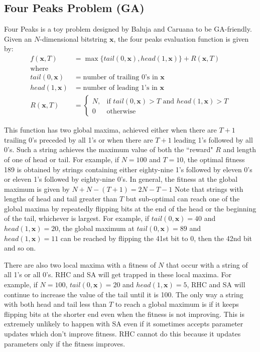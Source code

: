 \documentclass[letterpaper]{article}
\begin{document}
	\subsection{Four Peaks Problem (GA)}
	\label{sec:4peaks}
	Four Peaks is a toy problem designed by Baluja and Caruana\cite{balujaRemovingGeneticsStandard1995} to be GA-friendly. Given an $N$-dimensional bitstring $\mathbf{x}$, the four peaks evaluation function is given by:
	\begin{align*}
		f(\mathbf{x}, T) &= \max\{tail(0, \mathbf{x}), head(1, \mathbf{x})\} + R(\mathbf{x}, T) \\
		\text{where} \\
		tail(0, \mathbf{x}) &= \text{number of trailing 0's in } \mathbf{x} \\
		head(1, \mathbf{x}) &= \text{number of leading 1's in } \mathbf{x} \\
		R(\mathbf{x}, T) &= 
		\begin{cases}
		N, & \text{if } tail(0, \mathbf{x}) > T \text{ and } head(1, \mathbf{x}) > T \\
		0 & \text{otherwise}
		\end{cases}
	\end{align*}
	
	This function has two global maxima, achieved either when there are $T+1$ trailing 0's preceded by all 1's or when there are $T+1$ leading 1's followed by all 0's. Such a string achieves the maximum value of both the ``reward" $R$ and length of one of head or tail. For example, if $N = 100$ and $T = 10$, the optimal fitness 189 is obtained by strings containing either eighty-nine 1's followed by eleven 0's or eleven 1's followed by eighty-nine 0's. In general, the fitness at the global maximum is given by $N + N - (T + 1) = 2N - T - 1$ Note that strings with lengths of head and tail greater than $T$ but sub-optimal can reach one of the global maxima by repeatedly flipping bits at the end of the head or the beginning of the tail, whichever is largest. For example, if $tail(0, \mathbf{x}) = 40$ and $head(1, \mathbf{x}) = 20$, the global maximum at $tail(0, \mathbf{x}) = 89$ and $head(1, \mathbf{x}) = 11$ can be reached by flipping the 41st bit to 0, then the 42nd bit and so on.
	
	There are also two local maxima with a fitness of $N$ that occur with a string of all 1's or all 0's. RHC and SA will get trapped in these local maxima. For example, if $N = 100$, $tail(0, \mathbf{x}) = 20$ and $head(1, \mathbf{x}) = 5$, RHC and SA will continue to increase the value of the tail until it is 100. The only way a string with both head and tail less than $T$ to reach a global maximum is if it keeps flipping bits at the shorter end even when the fitness is not improving. This is extremely unlikely to happen with SA even if it sometimes accepts parameter updates which don't improve fitness. RHC cannot do this because it updates parameters only if the fitness improves.
	
\end{document}
